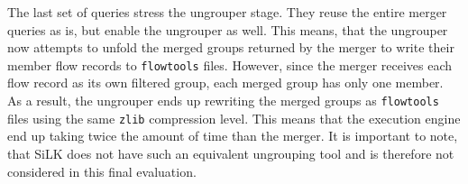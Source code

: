 The last set of queries stress the ungrouper stage. They reuse the entire
merger queries as is, but enable the ungrouper as well. This means, that the
ungrouper now attempts to unfold the merged groups returned by the merger to
write their member flow records to \texttt{flowtools} files.  However, since
the merger receives each flow record as its own filtered group, each merged
group has only one member. As a result, the ungrouper ends up rewriting the
merged groups as \texttt{flowtools} files using the same \texttt{zlib}
compression level. This means that the execution engine end up taking twice
the amount of time than the merger. It is important to note, that SiLK does
not have such an equivalent ungrouping tool and is therefore not considered in
this final evaluation.
